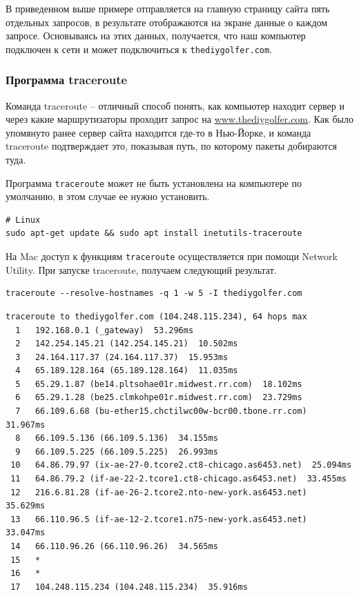 \documentclass[12pt]{article}
\begin{document}
В приведенном выше примере отправляется на главную страницу сайта пять
отдельных запросов, в результате отображаются на экране данные о каждом запросе.
Основываясь на этих данных, получается, что наш компьютер подключен к
сети и может подключиться к \texttt{thediygolfer.com}.

\hypertarget{traceroute}{%
\subsubsection{\texorpdfstring{\protect\hyperlink{traceroute}{}Программа
traceroute}{Программа traceroute}}\label{traceroute}}

Команда traceroute -- отличный способ понять, как компьютер находит
сервер и через какие маршрутизаторы проходит запрос на
\href{http://www.thediygolfer.com}{www.thediygolfer.com}. Как было
упомянуто ранее сервер сайта находится где-то в Нью-Йорке, и команда
traceroute подтверждает это, показывая путь, по которому пакеты
добираются туда.

Программа \texttt{traceroute} может не быть установлена на компьютере по умолчанию, в этом
случае ее нужно установить.
\begin{verbatim}
# Linux
sudo apt-get update && sudo apt install inetutils-traceroute
\end{verbatim}

На Mac доступ к функциям \texttt{traceroute} осуществляется при помощи Network
Utility. При запуске traceroute, получаем следующий результат.
\begin{verbatim}
traceroute --resolve-hostnames -q 1 -w 5 -I thediygolfer.com
\end{verbatim}

\begin{verbatim}
traceroute to thediygolfer.com (104.248.115.234), 64 hops max
  1   192.168.0.1 (_gateway)  53.296ms
  2   142.254.145.21 (142.254.145.21)  10.502ms
  3   24.164.117.37 (24.164.117.37)  15.953ms
  4   65.189.128.164 (65.189.128.164)  11.035ms
  5   65.29.1.87 (be14.pltsohae01r.midwest.rr.com)  18.102ms
  6   65.29.1.28 (be25.clmkohpe01r.midwest.rr.com)  23.729ms
  7   66.109.6.68 (bu-ether15.chctilwc00w-bcr00.tbone.rr.com)  31.967ms
  8   66.109.5.136 (66.109.5.136)  34.155ms
  9   66.109.5.225 (66.109.5.225)  26.993ms
 10   64.86.79.97 (ix-ae-27-0.tcore2.ct8-chicago.as6453.net)  25.094ms
 11   64.86.79.2 (if-ae-22-2.tcore1.ct8-chicago.as6453.net)  33.455ms
 12   216.6.81.28 (if-ae-26-2.tcore2.nto-new-york.as6453.net)  35.629ms
 13   66.110.96.5 (if-ae-12-2.tcore1.n75-new-york.as6453.net)  33.047ms
 14   66.110.96.26 (66.110.96.26)  34.565ms
 15   *
 16   *
 17   104.248.115.234 (104.248.115.234)  35.916ms
\end{verbatim}
\end{document}
